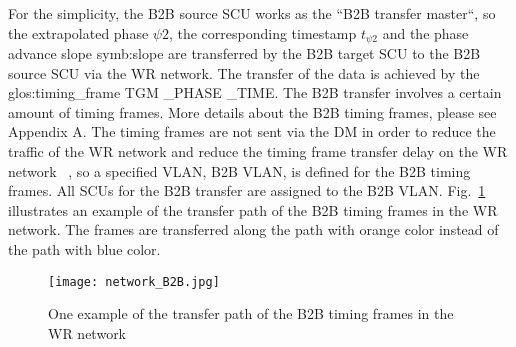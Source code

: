 For the simplicity, the B2B source SCU works as the ``B2B transfer master``, so the extrapolated phase $\psi2$, the corresponding timestamp $t_{\psi2}$ and the phase advance slope \gls{symb:slope} are transferred by the B2B target SCU to the B2B source SCU via the WR network. The transfer of the data is achieved by the \gls{glos:timing_frame} TGM \_PHASE \_TIME. The B2B transfer involves a certain amount of timing frames. More details about the B2B timing frames, please see Appendix A. The timing frames are not sent via the DM in order to reduce the traffic of the WR network and reduce the timing frame transfer delay on the WR network ~\cite{bai_concept_2016}, so a specified VLAN, B2B \gls{VLAN}, is defined for the B2B timing frames. All SCUs for the B2B transfer are assigned to the B2B VLAN. Fig.~\ref{network_B2B} illustrates an example of the transfer path of the B2B timing frames in the WR network. The frames are transferred along the path with orange color instead of the path with blue color. 
 \begin{figure}[!htb]
   \centering   
   \texttt{[image: network\_B2B.jpg]}
   \caption{One example of the transfer path of the B2B timing frames in the WR network}
   \label{network_B2B}
\end{figure}
